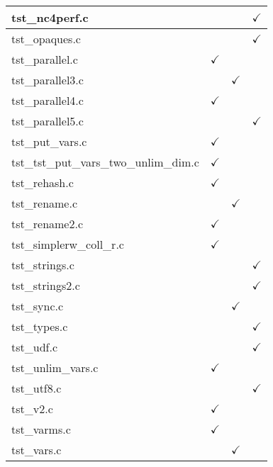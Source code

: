 \begin{table}[H]
\begin{tabular}{|l|c|c|c|}
tst\_nc4perf.c          &               &               & $\checkmark$  \\ \hline
tst\_opaques.c          &               &               & $\checkmark$  \\ \hline
tst\_parallel.c         & $\checkmark$  &               &               \\ \hline
tst\_parallel3.c        &               & $\checkmark$  &               \\ \hline
tst\_parallel4.c        & $\checkmark$  &               &               \\ \hline
tst\_parallel5.c        &               &               & $\checkmark$  \\ \hline
tst\_put\_vars.c        & $\checkmark$  &               &               \\ \hline
tst\_tst\_put\_vars\_two\_unlim\_dim.c & $\checkmark$ & &               \\ \hline
tst\_rehash.c           & $\checkmark$  &               &               \\ \hline
tst\_rename.c           &               & $\checkmark$  &               \\ \hline
tst\_rename2.c          & $\checkmark$  &               &               \\ \hline
tst\_simplerw\_coll\_r.c & $\checkmark$ &               &               \\ \hline
tst\_strings.c          &               &               & $\checkmark$  \\ \hline
tst\_strings2.c         &               &               & $\checkmark$  \\ \hline
tst\_sync.c             &               & $\checkmark$  &               \\ \hline
tst\_types.c            &               &               & $\checkmark$  \\ \hline
tst\_udf.c              &               &               & $\checkmark$  \\ \hline
tst\_unlim\_vars.c      & $\checkmark$  &               &               \\ \hline
tst\_utf8.c             &               &               & $\checkmark$  \\ \hline
tst\_v2.c               & $\checkmark$  &               &               \\ \hline
tst\_varms.c            & $\checkmark$  &               &               \\ \hline
tst\_vars.c             &               & $\checkmark$  &               \\ \hline

\end{tabular}
\end{table}
